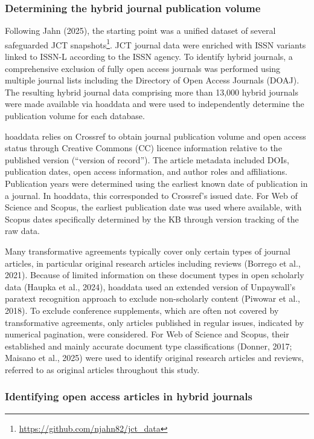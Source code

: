\documentclass[a4paper,man,floatsintext,longtable,noextraspace,10pt]{apa6}
\begin{document}
\subsubsection{Determining the hybrid journal publication
volume}\label{determining-the-hybrid-journal-publication-volume}

Following Jahn (2025), the starting point was a unified dataset of
several safeguarded JCT snapshots\footnote{\url{https://github.com/njahn82/jct_data}}.
JCT journal data were enriched with ISSN variants linked to ISSN-L
according to the ISSN agency. To identify hybrid journals, a
comprehensive exclusion of fully open access journals was performed
using multiple journal lists including the Directory of Open Access
Journals (DOAJ). The resulting hybrid journal data comprising more than
13,000 hybrid journals were made available via hoaddata and were used to
independently determine the publication volume for each database.

hoaddata relies on Crossref to obtain journal publication volume and
open access status through Creative Commons (CC) licence information
relative to the published version (``version of record''). The article
metadata included DOIs, publication dates, open access information, and
author roles and affiliations. Publication years were determined using
the earliest known date of publication in a journal. In hoaddata, this
corresponded to Crossref's issued date. For Web of Science and Scopus,
the earliest publication date was used where available, with Scopus
dates specifically determined by the KB through version tracking of the
raw data.

Many transformative agreements typically cover only certain types of
journal articles, in particular original research articles including
reviews (Borrego et al., 2021). Because of limited information on these
document types in open scholarly data (Haupka et al., 2024), hoaddata
used an extended version of Unpaywall's paratext recognition approach to
exclude non-scholarly content (Piwowar et al., 2018). To exclude
conference supplements, which are often not covered by transformative
agreements, only articles published in regular issues, indicated by
numerical pagination, were considered. For Web of Science and Scopus,
their established and mainly accurate document type classifications
(Donner, 2017; Maisano et al., 2025) were used to identify original
research articles and reviews, referred to as original articles
throughout this study.

\subsubsection{Identifying open access articles in hybrid
journals}\label{identifying-open-access-articles-in-hybrid-journals}
\end{document}
